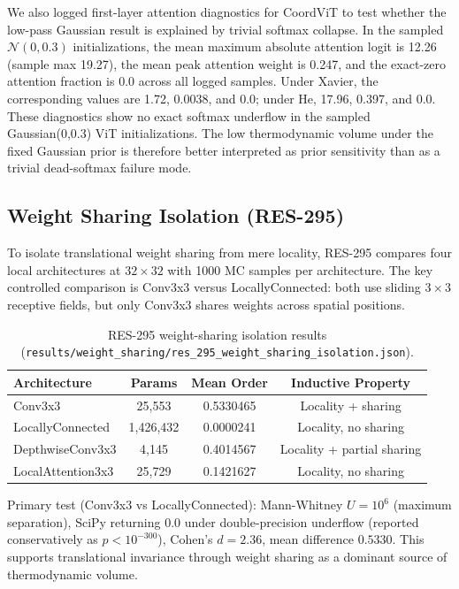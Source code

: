 We also logged first-layer attention diagnostics for CoordViT to test whether the low-pass Gaussian result is explained by trivial softmax collapse. In the sampled $\mathcal{N}(0,0.3)$ initializations, the mean maximum absolute attention logit is 12.26 (sample max 19.27), the mean peak attention weight is 0.247, and the exact-zero attention fraction is 0.0 across all logged samples. Under Xavier, the corresponding values are 1.72, 0.0038, and 0.0; under He, 17.96, 0.397, and 0.0. These diagnostics show no exact softmax underflow in the sampled Gaussian(0,0.3) ViT initializations. The low thermodynamic volume under the fixed Gaussian prior is therefore better interpreted as prior sensitivity than as a trivial dead-softmax failure mode.

\subsection{Weight Sharing Isolation (RES-295)}
\label{app:weight_sharing_isolation}

To isolate translational weight sharing from mere locality, RES-295 compares four local architectures at $32\times 32$ with 1000 MC samples per architecture. The key controlled comparison is Conv3x3 versus LocallyConnected: both use sliding $3\times 3$ receptive fields, but only Conv3x3 shares weights across spatial positions.

\begin{table}[H]
\centering
\caption{RES-295 weight-sharing isolation results (\texttt{results/weight\_sharing/res\_295\_weight\_sharing\_isolation.json}).}
\label{tab:weight_sharing_isolation}
\begin{tabular}{lccc}
\toprule
Architecture & Params & Mean Order & Inductive Property \\
\midrule
Conv3x3 & 25,553 & 0.5330465 & Locality + sharing \\
LocallyConnected & 1,426,432 & 0.0000241 & Locality, no sharing \\
DepthwiseConv3x3 & 4,145 & 0.4014567 & Locality + partial sharing \\
LocalAttention3x3 & 25,729 & 0.1421627 & Locality, no sharing \\
\bottomrule
\end{tabular}
\end{table}

Primary test (Conv3x3 vs LocallyConnected): Mann-Whitney $U=10^6$ (maximum separation), SciPy returning 0.0 under double-precision underflow (reported conservatively as $p<10^{-300}$), Cohen's $d=2.36$, mean difference $0.5330$. This supports translational invariance through weight sharing as a dominant source of thermodynamic volume.

